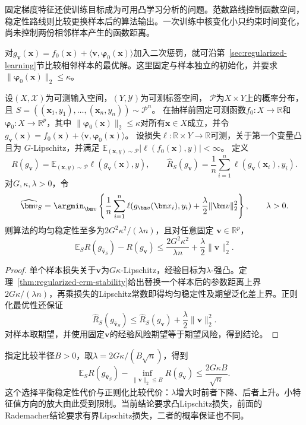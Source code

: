 固定梯度特征还使训练目标成为可用凸学习分析的问题。范数路线控制函数空间，稳定性路线则比较更换样本后的算法输出。一次训练中核变化小只约束时间变化，尚未控制两份相邻样本产生的函数距离。

对$g_{\bm v}(\bm x)=f_0(\bm x)+\langle\bm v,\bm\varphi_0(\bm x)\rangle$加入二次惩罚，就可沿第~\ref{sec:regularized-learning}节比较相邻样本的最优解。这里固定与样本独立的初始化，并要求$\|\bm\varphi_0(\bm x)\|_2\leq\kappa$。

\begin{theorem}[正则化固定特征模型的稳定性]
\label{thm:ntk-stability-risk}
设$(X,\mathcal X)$为可测输入空间，$(Y,\mathcal Y)$为可测标签空间，
$\mathcal P$为$X\times Y$上的概率分布，且
$S=((\bm x_1,y_1),\ldots,(\bm x_n,y_n))\sim\mathcal P^n$。
在抽样前固定可测函数$f_0:X\to\mathbb R$和
$\bm\varphi_0:X\to\mathbb R^p$，其中
$\|\bm\varphi_0(\bm x)\|_2\leq\kappa$对所有$\bm x\in X$成立，并令
$g_{\bm v}(\bm x)=f_0(\bm x)+\langle\bm v,\bm\varphi_0(\bm x)\rangle$。
设损失$\ell:\mathbb R\times Y\to\mathbb R$可测，关于第一个变量凸且为
$G$-Lipschitz，并满足
$\mathbb E_{(\bm x,y)\sim\mathcal P}|\ell(f_0(\bm x),y)|<\infty$。
定义
\[
 R(g_{\bm v})=\mathbb E_{(\bm x,y)\sim\mathcal P}
                    \ell(g_{\bm v}(\bm x),y),\qquad
 \hat R_S(g_{\bm v})=\frac1n\sum_{i=1}^n
                    \ell(g_{\bm v}(\bm x_i),y_i).
\]
对$G,\kappa,\lambda>0$，令
\[
 \widehat{\bm v}_S=\argmin_{\bm v}
 \left\{\frac1n\sum_{i=1}^n\ell(g_{\bm v}(\bm x_i),y_i)
       +\frac\lambda2\|\bm v\|_2^2\right\},\qquad\lambda>0.
\]
则算法的均匀稳定性至多为$2G^2\kappa^2/(\lambda n)$，且对任意固定
$\bm v\in\mathbb R^p$，
\[
 \mathbb E_S R(g_{\widehat{\bm v}_S})-R(g_{\bm v})
 \leq\frac{2G^2\kappa^2}{\lambda n}+\frac\lambda2\|\bm v\|_2^2.
\]
\end{theorem}
\begin{proof}
单个样本损失关于$\bm v$为$G\kappa$-Lipschitz，经验目标为$\lambda$-强凸。定理~\ref{thm:regularized-erm-stability}给出替换一个样本后的参数距离上界$2G\kappa/(\lambda n)$，再乘损失的Lipschitz常数即得均匀稳定性及期望泛化差上界。正则化最优性还保证
\[
 \hat R_S(g_{\widehat{\bm v}_S})
 \leq\hat R_S(g_{\bm v})+\frac\lambda2\|\bm v\|_2^2.
\]
对样本取期望，并使用固定$\bm v$的经验风险期望等于期望风险，得到结论。
\end{proof}

指定比较半径$B>0$，取$\lambda=2G\kappa/(B\sqrt n)$，得到
\begin{equation}
 \mathbb E_S R(g_{\widehat{\bm v}_S})
 -\inf_{\|\bm v\|_2\leq B}R(g_{\bm v})
 \leq\frac{2G\kappa B}{\sqrt n}.
 \label{eq:ntk-sample-risk}
\end{equation}
这个选择平衡稳定性代价与正则化比较代价：$\lambda$增大时前者下降、后者上升。小特征值方向的放大由此受到限制。当前结论要求凸Lipschitz损失，前面的Rademacher结论要求有界Lipschitz损失，二者的概率保证也不同。

